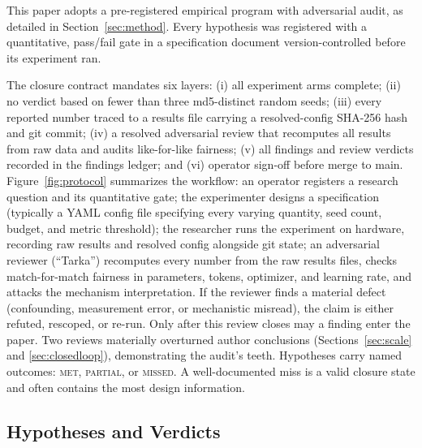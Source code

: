 
This paper adopts a pre-registered empirical program with adversarial audit, as detailed in Section~\ref{sec:method}.
Every hypothesis was registered with a quantitative, pass/fail gate in a specification document version-controlled
before its experiment ran.



The closure contract mandates six layers: (i) all experiment arms complete; (ii) no
verdict based on fewer than three md5-distinct random seeds; (iii) every reported number traced to a results file
carrying a resolved-config SHA-256 hash and git commit; (iv) a resolved adversarial review that recomputes all
results from raw data and audits like-for-like fairness; (v) all findings and review verdicts recorded in the
findings ledger; and (vi) operator sign-off before merge to main. Figure~\ref{fig:protocol} summarizes the workflow:
an operator registers a research question and its quantitative gate; the experimenter designs a specification (typically
a YAML config file specifying every varying quantity, seed count, budget, and metric threshold); the researcher runs the
experiment on hardware, recording raw results and resolved config alongside git state; an adversarial reviewer (``Tarka'')
recomputes every number from the raw results files, checks match-for-match fairness in parameters, tokens, optimizer,
and learning rate, and attacks the mechanism interpretation. If the reviewer finds a material defect (confounding,
measurement error, or mechanistic misread), the claim is either refuted, rescoped, or re-run. Only after this review
closes may a finding enter the paper. Two reviews materially overturned author conclusions (Sections~\ref{sec:scale} and
\ref{sec:closedloop}), demonstrating the audit's teeth. Hypotheses carry named outcomes: \textsc{met}, \textsc{partial},
or \textsc{missed}. A well-documented miss is a valid closure state and often contains the most design information.

\subsection{Hypotheses and Verdicts}

